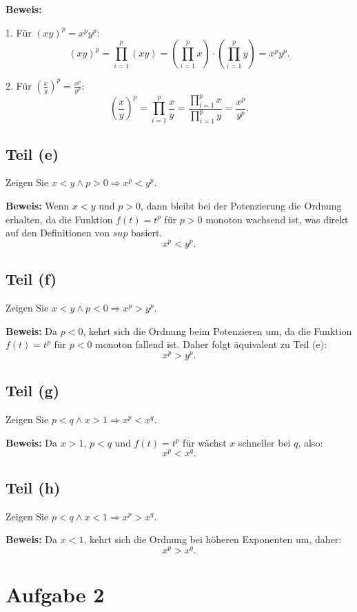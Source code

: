 \documentclass[11pt]{article}
\begin{document}
\textbf{Beweis:}

1. Für \( (xy)^p = x^p y^p \):
   \[
   (xy)^p = \prod_{i=1}^{p} (xy) = \left( \prod_{i=1}^{p} x \right) \cdot \left( \prod_{i=1}^{p} y \right) = x^p y^p.
   \]

2. Für \( \left( \frac{x}{y} \right)^p = \frac{x^p}{y^p} \):
   \[
   \left( \frac{x}{y} \right)^p = \prod_{i=1}^{p} \frac{x}{y} = \frac{\prod_{i=1}^{p} x}{\prod_{i=1}^{p} y} = \frac{x^p}{y^p}.
   \]

\subsection*{Teil (e)}
Zeigen Sie \( x < y \land p > 0 \Rightarrow x^p < y^p \).

\textbf{Beweis:} Wenn \(x < y\) und \(p>0\), dann bleibt bei der Potenzierung die Ordnung erhalten, da die Funktion \(f(t)=t^p\) für \(p > 0\) monoton wachsend ist, was direkt auf den Definitionen von \(sup\) basiert.
\[
x^p < y^p.
\]

\subsection*{Teil (f)}
Zeigen Sie \( x < y \land p < 0 \Rightarrow x^p > y^p \).

\textbf{Beweis:} Da \( p < 0 \), kehrt sich die Ordnung beim Potenzieren um, da die Funktion \(f(t)=t^p\) für \(p < 0\) monoton fallend ist. Daher folgt äquivalent zu Teil (e):
\[
x^p > y^p.
\]

\subsection*{Teil (g)}
Zeigen Sie \( p < q \land x > 1 \Rightarrow x^p < x^q \).

\textbf{Beweis:} Da \( x > 1 \), \( p < q \) und \(f(t)=t^p\) für wächst \( x \) schneller bei \( q \), also:
\[
x^p < x^q.
\]

\subsection*{Teil (h)}
Zeigen Sie \( p < q \land x < 1 \Rightarrow x^p > x^q \).

\textbf{Beweis:} Da \( x < 1 \), kehrt sich die Ordnung bei höheren Exponenten um, daher:
\[
x^p > x^q.
\]

\section*{Aufgabe 2}
\end{document}
